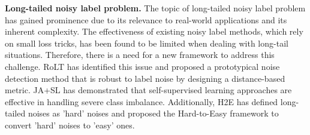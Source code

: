 \textbf{Long-tailed noisy label problem.} The topic of long-tailed noisy label problem has gained prominence due to its relevance to real-world applications and its inherent complexity. The effectiveness of existing noisy label methods, which rely on small loss tricks, has been found to be limited when dealing with long-tail situations. Therefore, there is a need for a new framework to address this challenge. RoLT \cite{wei2021robust} has identified this issue and proposed a prototypical noise detection method that is robust to label noise by designing a distance-based metric. JA+SL \cite{karthik2021learning} has demonstrated that self-supervised learning approaches are effective in handling severe class imbalance. Additionally, H2E \cite{yi2022identifying} has defined long-tailed noises as 'hard' noises and proposed the Hard-to-Easy framework to convert 'hard' noises to 'easy' ones.

